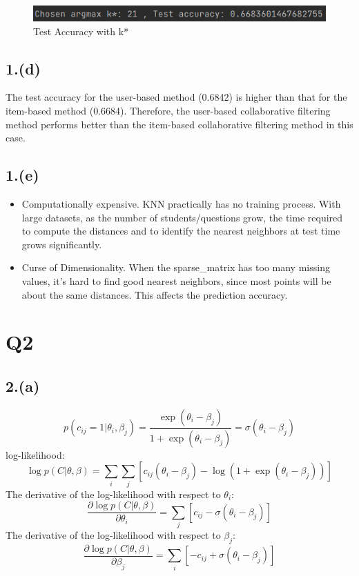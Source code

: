 \documentclass{article}
\begin{document}
\begin{figure}[H]
    \centering
    \includegraphics[width=\textwidth]{knn_impute_by_item_test.png}
    \caption{Test Accuracy with k*}
\end{figure}

\subsection*{1.(d)}
The test accuracy for the user-based method (0.6842) is higher than that for the item-based method (0.6684). Therefore, the user-based collaborative filtering method performs better than the item-based collaborative filtering method in this case.

\subsection*{1.(e)}
\begin{itemize}
    \item Computationally expensive. KNN practically has no training process. With large datasets, as the number of students/questions grow, the time required to compute the distances and to identify the nearest neighbors at test time grows significantly.
    \item Curse of Dimensionality. When the sparse\_matrix has too many missing values, it’s hard to find good nearest neighbors, since most points will be about the same distances. This affects the prediction accuracy.
\end{itemize}


\newpage
\section*{Q2}

\subsection*{2.(a)}

\[
p(c_{ij} = 1 | \theta_i, \beta_j) = \frac{\exp(\theta_i - \beta_j)}{1 + \exp(\theta_i - \beta_j)} = \sigma(\theta_i - \beta_j)
\]
log-likelihood:
\[
\log p(C | \theta, \beta) = \sum_{i}\sum_{j} \left[ c_{ij} (\theta_i - \beta_j) - \log (1 + \exp(\theta_i - \beta_j)) \right]
\]
The derivative of the log-likelihood with respect to $\theta_i$:
\[
\frac{\partial \log p(C | \theta, \beta)}{\partial \theta_i} = \sum_{j} \left[ c_{ij} - \sigma(\theta_i - \beta_j) \right]
\]
The derivative of the log-likelihood with respect to $\beta_j$:
\[
\frac{\partial \log p(C | \theta, \beta)}{\partial \beta_j} = \sum_{i} \left[ - c_{ij} + \sigma(\theta_i - \beta_j) \right]
\]
\end{document}
